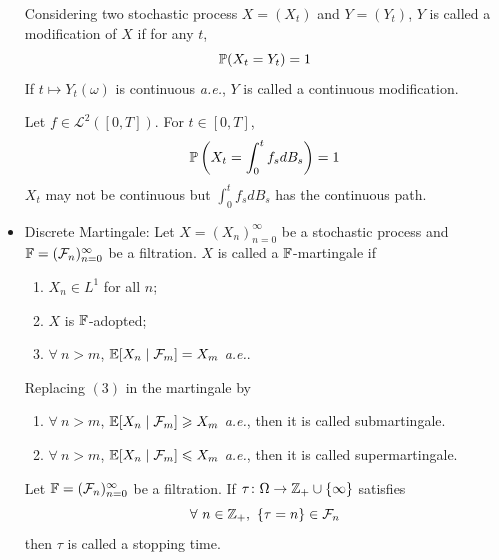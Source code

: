 \documentclass[a4paper,12pt]{article}
\begin{document}
\begin{itemize}
  \noindent Considering two stochastic process $X=(X_t)$ and $Y=(Y_t)$, $Y$ is called a modification of $X$ if for any $t$,
  \begin{equation*}
    \mathbb{P}(X_t = Y_t) = 1
  \end{equation*}
  If $t \mapsto Y_t(\omega)$ is continuous \emph{a.e.}, $Y$ is called a continuous modification.
  \begin{rmk}
    Let $f \in \mathcal{L}^2([0,T])$. For $t \in [0,T]$,
    \begin{equation*}
      \mathbb{P}\left(X_t = \int_0^t f_s dB_s\right) =1
    \end{equation*}
    $X_t$ may not be continuous but $\int_0^t f_s dB_s$ has the continuous path.
  \end{rmk}

  \item Discrete Martingale: Let $X=(X_n)_{n=0}^{\infty}$ be a stochastic process and $\mathbb{F} = (\mathcal{F}_n)_{n=0}^{\infty}$ be a filtration. $X$ is called a $\mathbb{F}$-martingale if
  \begin{enumerate}[label=(\arabic*)]
    \item $X_n \in L^1$ for all $n$;
    \item $X$ is $\mathbb{F}$-adopted;
    \item $\forall~n > m$, $\mathbb{E}[X_n \mid \mathcal{F}_m] = X_m$ \emph{a.e.}.
  \end{enumerate}

  \noindent Replacing $(3)$ in the martingale by 
  \begin{enumerate}[label=(\arabic*)]
    \item $\forall~n > m$, $\mathbb{E}[X_n \mid \mathcal{F}_m] \geqslant X_m$ \emph{a.e.}, then it is called submartingale.
    \item $\forall~n > m$, $\mathbb{E}[X_n \mid \mathcal{F}_m] \leqslant X_m$ \emph{a.e.}, then it is called supermartingale.
  \end{enumerate}

  \noindent Let $\mathbb{F} = (\mathcal{F}_n)_{n=0}^{\infty}$ be a filtration. If $\tau \colon \Omega \rightarrow \mathbb{Z}_+ \cup \left\{\infty\right\}$ satisfies
  \begin{equation*}
    \forall~n \in \mathbb{Z}_+,~\left\{\tau = n\right\} \in \mathcal{F}_n
  \end{equation*}
  then $\tau$ is called a stopping time.


\end{itemize}
\end{document}

